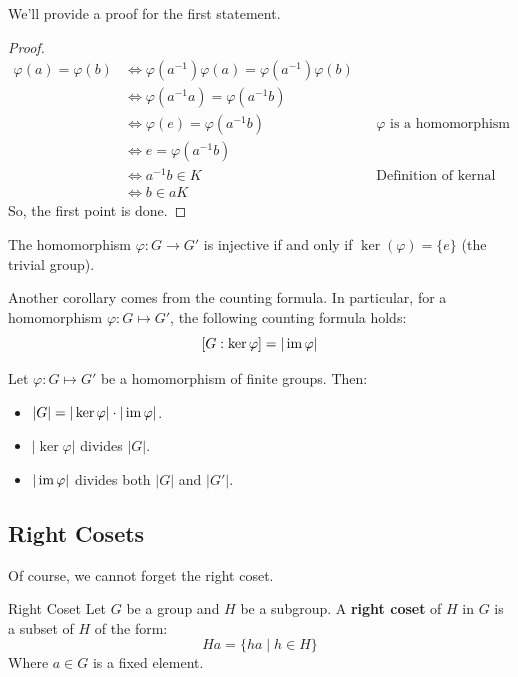 \documentclass[letterpaper]{article}
\begin{document}
We'll provide a proof for the first statement. 
\begin{mdframed}
    \begin{proof}
        \begin{equation*}
            \begin{aligned}
                \varphi(a) = \varphi(b) &\iff \varphi(a^{-1}) \varphi(a) = \varphi(a^{-1}) \varphi(b) \\ 
                    &\iff \varphi(a^{-1}a) = \varphi(a^{-1}b) \\ 
                    &\iff \varphi(e) = \varphi(a^{-1} b) && \varphi \text{ is a homomorphism}\\ 
                    &\iff e = \varphi(a^{-1} b) \\ 
                    &\iff a^{-1} b \in K && \text{Definition of kernal}\\ 
                    &\iff b \in aK 
            \end{aligned}
        \end{equation*}
        So, the first point is done. 
    \end{proof}
\end{mdframed}

\begin{corollary}{}{}
    The homomorphism $\varphi: G \to G'$ is injective if and only if $\ker(\varphi) = \{e\}$ (the trivial group). 
\end{corollary}

Another corollary comes from the counting formula. In particular, for a homomorphism $\varphi: G \mapsto G'$, the following counting formula holds: 
\[[G: \ker \varphi] = |\operatorname{im} \varphi|\]
\begin{corollary}{}{}
    Let $\varphi: G \mapsto G'$ be a homomorphism of finite groups. Then: 
    \begin{itemize}
        \item $|G| = |\ker \varphi| \cdot |\operatorname{im} \varphi|$.
        \item $|\ker \varphi|$  divides $|G|$. 
        \item $|\operatorname{im} \varphi|$ divides both $|G|$ and $|G'|$. 
    \end{itemize}
\end{corollary}


\subsection{Right Cosets}
Of course, we cannot forget the right coset. 
\begin{definition}{Right Coset}{}
    Let $G$ be a group and $H$ be a subgroup. A \textbf{right coset} of $H$ in $G$ is a subset of $H$ of the form:  
    \[Ha = \{ha \mid h \in H\}\]
    Where $a \in G$ is a fixed element. 
\end{definition}
\end{document}
